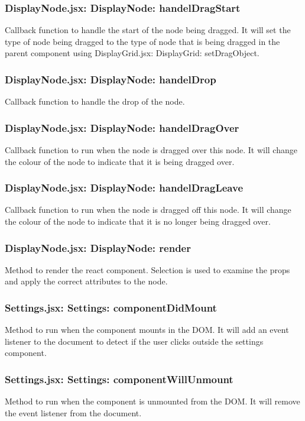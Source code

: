 \documentclass{article}
\begin{document}
\subsubsection{DisplayNode.jsx: DisplayNode: handelDragStart}
Callback function to handle the start of the node being dragged. It will set the type of node being dragged to the type of node that is being dragged in the parent component using DisplayGrid.jsx: DisplayGrid: setDragObject.

\subsubsection{DisplayNode.jsx: DisplayNode: handelDrop}
Callback function to handle the drop of the node.

\subsubsection{DisplayNode.jsx: DisplayNode: handelDragOver}
Callback function to run when the node is dragged over this node. It will change the colour of the node to indicate that it is being dragged over.

\subsubsection{DisplayNode.jsx: DisplayNode: handelDragLeave}
Callback function to run when the node is dragged off this node. It will change the colour of the node to indicate that it is no longer being dragged over.

\subsubsection{DisplayNode.jsx: DisplayNode: render}
Method to render the react component. Selection is used to examine the props and apply the correct attributes to the node.

\subsubsection{Settings.jsx: Settings: componentDidMount}
Method to run when the component mounts in the DOM. It will add an event listener to the document to detect if the user clicks outside the settings component.

\subsubsection{Settings.jsx: Settings: componentWillUnmount}
Method to run when the component is unmounted from the DOM. It will remove the event listener from the document.
\end{document}
